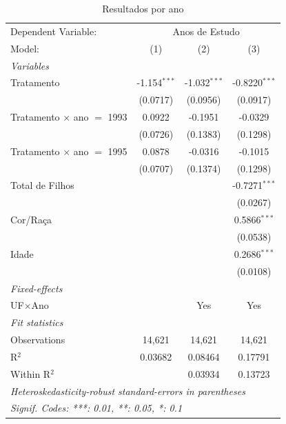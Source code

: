 
\begin{table}[htbp]
   \caption{\label{tab:dif_ano} Resultados por ano}
   \centering
\begin{tabular*}{\textwidth}{@{\extracolsep{\fill}}lccc}
      \tabularnewline \midrule \midrule
      Dependent Variable: & \multicolumn{3}{c}{Anos de Estudo}\\
      Model:                            & (1)            & (2)            & (3)\\  
      \midrule
      \emph{Variables}\\
      Tratamento                        & -1.154$^{***}$ & -1.032$^{***}$ & -0.8220$^{***}$\\   
                                        & (0.0717)       & (0.0956)       & (0.0917)\\   
      Tratamento $\times$ ano $=$ 1993  & 0.0922         & -0.1951        & -0.0329\\   
                                        & (0.0726)       & (0.1383)       & (0.1298)\\   
      Tratamento $\times$ ano $=$ 1995  & 0.0878         & -0.0316        & -0.1015\\   
                                        & (0.0707)       & (0.1374)       & (0.1298)\\   
      Total de Filhos                   &                &                & -0.7271$^{***}$\\   
                                        &                &                & (0.0267)\\   
      Cor/Raça                          &                &                & 0.5866$^{***}$\\   
                                        &                &                & (0.0538)\\   
      Idade                             &                &                & 0.2686$^{***}$\\   
                                        &                &                & (0.0108)\\   
      \midrule
      \emph{Fixed-effects}\\
      UF$\times$Ano                     &                & Yes            & Yes\\  
      \midrule
      \emph{Fit statistics}\\
      Observations                      & 14,621         & 14,621         & 14,621\\  
      R$^2$                             & 0.03682        & 0.08464        & 0.17791\\  
      Within R$^2$                      &                & 0.03934        & 0.13723\\  
      \midrule \midrule
      \multicolumn{4}{l}{\emph{Heteroskedasticity-robust standard-errors in parentheses}}\\
      \multicolumn{4}{l}{\emph{Signif. Codes: ***: 0.01, **: 0.05, *: 0.1}}\\
   \end{tabular*}
\end{table}



